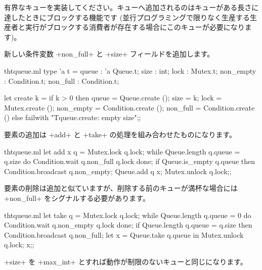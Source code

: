 \begin{exercise}
有界なキューを実装してください。キューへ追加されるのはキューがある長さに達したときにブロックする機能です (並行プログラミングで限りなく生産する生産者と実行がブロックする消費者が存在する場合にこのキューが必要になります)。
\end{exercise}
\begin{answer}
新しい条件変数 \ml+non_full+ と \ml+size+ フィールドを追加します。
%
\begin{listingcodefile}{thtqueue.ml}
type 'a t =
    { queue : 'a Queue.t; size : int; lock : Mutex.t;
      non_empty : Condition.t; non_full : Condition.t; }

let create k =
  if  k > 0 then
    { queue = Queue.create (); size = k; lock = Mutex.create ();
      non_empty = Condition.create (); non_full = Condition.create () }
  else failwith "Tqueue.create: empty size";;
\end{listingcodefile}
%
要素の追加は \ml+add+ と \ml+take+ の処理を組み合わせたものになります。
%
\begin{listingcodefile}{thtqueue.ml}
let add x q =
  Mutex.lock q.lock;
  while Queue.length q.queue = q.size
  do Condition.wait q.non_full q.lock done;
  if Queue.is_empty q.queue then Condition.broadcast q.non_empty;
  Queue.add q x;
  Mutex.unlock q.lock;;
\end{listingcodefile}
%
要素の削除は追加と似ていますが、削除する前のキューが満杯な場合には \ml+non_full+ をシグナルする必要があります。
%
\begin{codefile}{thtqueue.ml}
let take q =
  Mutex.lock q.lock;
  while Queue.length q.queue = 0
  do Condition.wait q.non_empty q.lock done;
  if Queue.length q.queue = q.size then Condition.broadcast q.non_full;
  let x = Queue.take q.queue in
  Mutex.unlock q.lock; x;;
\end{codefile}
%
\ml+size+ を \ml+max_int+ とすれば動作が制限のないキューと同じになります。
\end{answer}



